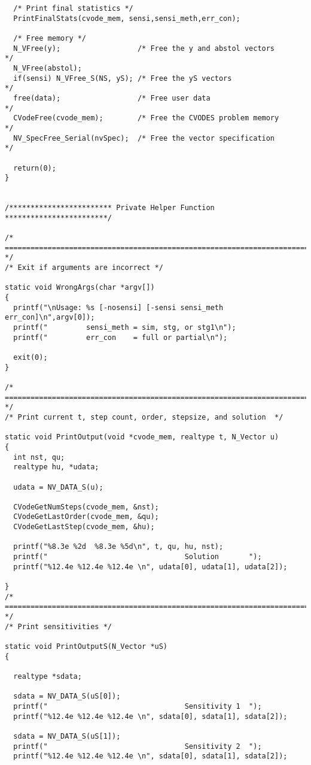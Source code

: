 \begin{verbatim}
  /* Print final statistics */
  PrintFinalStats(cvode_mem, sensi,sensi_meth,err_con);

  /* Free memory */
  N_VFree(y);                  /* Free the y and abstol vectors       */
  N_VFree(abstol);   
  if(sensi) N_VFree_S(NS, yS); /* Free the yS vectors                 */
  free(data);                  /* Free user data                      */
  CVodeFree(cvode_mem);        /* Free the CVODES problem memory      */
  NV_SpecFree_Serial(nvSpec);  /* Free the vector specification       */

  return(0);
}


/************************ Private Helper Function ************************/

/* ======================================================================= */
/* Exit if arguments are incorrect */

static void WrongArgs(char *argv[])
{
  printf("\nUsage: %s [-nosensi] [-sensi sensi_meth err_con]\n",argv[0]);
  printf("         sensi_meth = sim, stg, or stg1\n");
  printf("         err_con    = full or partial\n");
  
  exit(0);
}

/* ======================================================================= */
/* Print current t, step count, order, stepsize, and solution  */

static void PrintOutput(void *cvode_mem, realtype t, N_Vector u)
{
  int nst, qu;
  realtype hu, *udata;
  
  udata = NV_DATA_S(u);

  CVodeGetNumSteps(cvode_mem, &nst);
  CVodeGetLastOrder(cvode_mem, &qu);
  CVodeGetLastStep(cvode_mem, &hu);

  printf("%8.3e %2d  %8.3e %5d\n", t, qu, hu, nst);
  printf("                                Solution       ");
  printf("%12.4e %12.4e %12.4e \n", udata[0], udata[1], udata[2]);
  
}
/* ======================================================================= */
/* Print sensitivities */

static void PrintOutputS(N_Vector *uS)
{

  realtype *sdata;

  sdata = NV_DATA_S(uS[0]);
  printf("                                Sensitivity 1  ");
  printf("%12.4e %12.4e %12.4e \n", sdata[0], sdata[1], sdata[2]);
  
  sdata = NV_DATA_S(uS[1]);
  printf("                                Sensitivity 2  ");
  printf("%12.4e %12.4e %12.4e \n", sdata[0], sdata[1], sdata[2]);


\end{verbatim}
